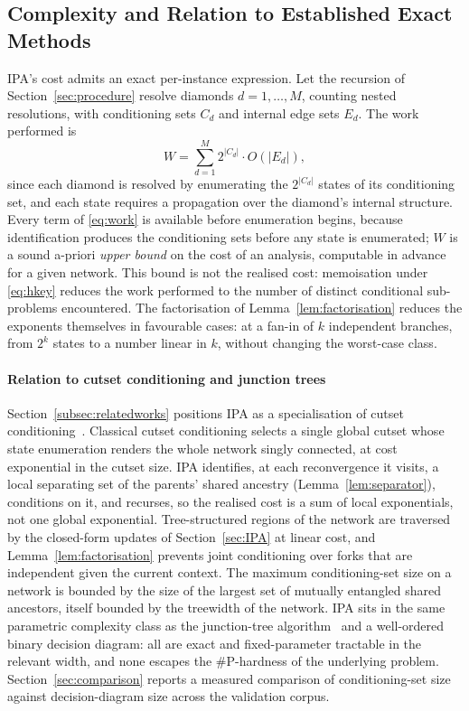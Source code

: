 \documentclass[preprint,12pt]{elsarticle}
\begin{document}
\subsection{Complexity and Relation to Established Exact Methods}\label{sec:complexity}

IPA's cost admits an exact per-instance expression. Let the recursion of Section~\ref{sec:procedure} resolve diamonds $d=1,\ldots,M$, counting nested resolutions, with conditioning sets $C_d$ and internal edge sets $E_d$. The work performed is
\begin{equation}
W=\sum_{d=1}^{M}2^{|C_d|}\cdot O(|E_d|),
\label{eq:work}
\end{equation}
since each diamond is resolved by enumerating the $2^{|C_d|}$ states of its conditioning set, and each state requires a propagation over the diamond's internal structure. Every term of \eqref{eq:work} is available before enumeration begins, because identification produces the conditioning sets before any state is enumerated; $W$ is a sound a-priori \emph{upper bound} on the cost of an analysis, computable in advance for a given network. This bound is not the realised cost: memoisation under \eqref{eq:hkey} reduces the work performed to the number of distinct conditional sub-problems encountered. The factorisation of Lemma~\ref{lem:factorisation} reduces the exponents themselves in favourable cases: at a fan-in of $k$ independent branches, from $2^k$ states to a number linear in $k$, without changing the worst-case class.

\paragraph{Relation to cutset conditioning and junction trees} Section~\ref{subsec:relatedworks} positions IPA as a specialisation of cutset conditioning~\cite{pearl_probabilistic_1988}. Classical cutset conditioning selects a single global cutset whose state enumeration renders the whole network singly connected, at cost exponential in the cutset size. IPA identifies, at each reconvergence it visits, a local separating set of the parents' shared ancestry (Lemma~\ref{lem:separator}), conditions on it, and recurses, so the realised cost is a sum of local exponentials, not one global exponential. Tree-structured regions of the network are traversed by the closed-form updates of Section~\ref{sec:IPA} at linear cost, and Lemma~\ref{lem:factorisation} prevents joint conditioning over forks that are independent given the current context. The maximum conditioning-set size on a network is bounded by the size of the largest set of mutually entangled shared ancestors, itself bounded by the treewidth of the network. IPA sits in the same parametric complexity class as the junction-tree algorithm~\cite{lauritzen_local_1988} and a well-ordered binary decision diagram: all are exact and fixed-parameter tractable in the relevant width, and none escapes the \#P-hardness of the underlying problem. Section~\ref{sec:comparison} reports a measured comparison of conditioning-set size against decision-diagram size across the validation corpus.
\end{document}

